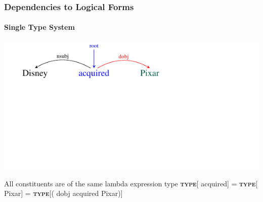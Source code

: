 \documentclass[mathserif,12pt]{beamer}
\newcommand\type[1]{\textbf{\textsc{type}}[#1]\xspace}
\begin{document}
\begin{frame}[noframenumbering]
\frametitle{Dependencies to Logical Forms}
\framesubtitle{Single Type System}
\vspace{-3em}
\begin{center}
\includegraphics[trim=2em 9.4em 10em 0em,clip=true,scale=1.3]{figures/pixar_dobj}


\end{center}

\vspace{1cm}

\begin{block}{\centering All constituents are of the same lambda expression type}
\centering
\vspace{0.1cm}
\type{{\color{blue} acquired}} =  \type{{\color{blue!40!green!60!black} Pixar}}  = \type{{({\color{red} dobj} {\color{blue} acquired} {\color{blue!40!green!60!black} Pixar})}}
\vspace{0.1cm}
\end{block}
\end{frame}
\end{document}
